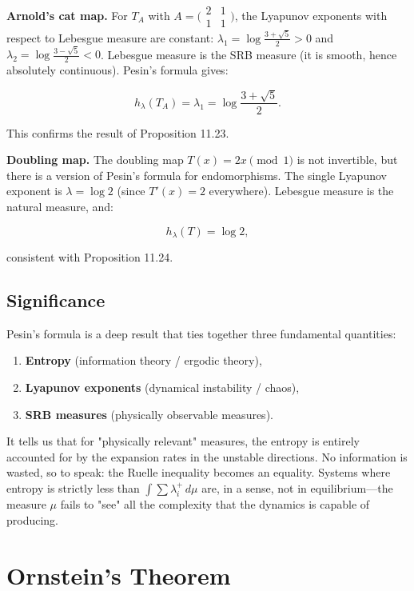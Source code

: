 \textbf{Arnold's cat map.} For $T_A$ with $A = \bigl(\begin{smallmatrix} 2 & 1 \\ 1 & 1\end{smallmatrix}\bigr)$, the Lyapunov exponents with respect to Lebesgue measure are constant: $\lambda_1 = \log\frac{3+\sqrt{5}}{2} > 0$ and $\lambda_2 = \log\frac{3-\sqrt{5}}{2} < 0$. Lebesgue measure is the SRB measure (it is smooth, hence absolutely continuous). Pesin's formula gives:

\[
h_\lambda(T_A) = \lambda_1 = \log\frac{3+\sqrt{5}}{2}.
\]

This confirms the result of Proposition 11.23.

\textbf{Doubling map.} The doubling map $T(x) = 2x \pmod 1$ is not invertible, but there is a version of Pesin's formula for endomorphisms. The single Lyapunov exponent is $\lambda = \log 2$ (since $T'(x) = 2$ everywhere). Lebesgue measure is the natural measure, and:

\[
h_\lambda(T) = \log 2,
\]

consistent with Proposition 11.24.

\subsection{Significance}\label{sec:11.9.4}

Pesin's formula is a deep result that ties together three fundamental quantities:

\begin{enumerate}[nosep]
  \item \textbf{Entropy} (information theory / ergodic theory),
  \item \textbf{Lyapunov exponents} (dynamical instability / chaos),
  \item \textbf{SRB measures} (physically observable measures).
\end{enumerate}

It tells us that for "physically relevant" measures, the entropy is entirely accounted for by the expansion rates in the unstable directions. No information is wasted, so to speak: the Ruelle inequality becomes an equality. Systems where entropy is strictly less than $\int \sum \lambda_i^+ \, d\mu$ are, in a sense, not in equilibrium---the measure $\mu$ fails to "see" all the complexity that the dynamics is capable of producing.


\bigskip


\section{Ornstein's Theorem}\label{sec:11.10}

